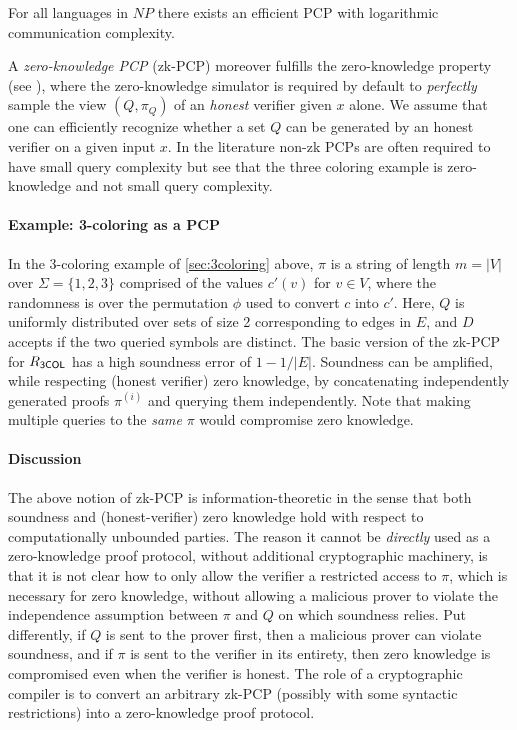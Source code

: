 \begin{theorem}\label{thm:pcp}
    For all languages in $NP$ there exists an efficient PCP with logarithmic communication complexity.
\end{theorem}

A \emph{zero-knowledge PCP} (zk-PCP) moreover fulfills the zero-knowledge property (see ), where the zero-knowledge simulator is required by default to {\em perfectly} sample the view $(Q,\pi_Q)$ of an {\em honest} verifier given $x$ alone.
We assume that one can efficiently recognize whether a set $Q$ can be generated by an honest verifier on a given input $x$.
In the literature non-zk PCPs are often required to have small query complexity but see that the three coloring example is zero-knowledge and not small query complexity.


\paragraph{Example: 3-coloring as a PCP}
In the 3-coloring example of \cref{sec:3coloring} above, $\pi$ is a string of length $m=|V|$ over $\Sigma=\{1,2,3\}$ comprised of the values $c'(v)$ for $v\in V$, where the randomness is over the permutation $\phi$ used to convert $c$ into $c'$.
Here, $Q$ is uniformly distributed over sets of size 2 corresponding to edges in $E$, and $D$ accepts if the two queried symbols are distinct.
The basic version of the zk-PCP for $R_{\sf 3COL}$ has a high soundness error of $1-1/|E|$.
Soundness can be amplified, while respecting (honest verifier) zero knowledge, by concatenating independently generated proofs $\pi^{(i)}$ and querying them independently. Note that making multiple queries to the {\em same} $\pi$ would compromise zero knowledge.


\paragraph{Discussion}
The above notion of zk-PCP is information-theoretic in the sense that both soundness and (honest-verifier) zero knowledge hold with respect to computationally unbounded parties.
The reason it cannot be {\em directly} used as a zero-knowledge proof protocol, without additional cryptographic machinery, is that it is not clear how to only allow the verifier a restricted access to $\pi$, which is necessary for zero knowledge, without allowing a malicious prover to violate the independence assumption between $\pi$ and $Q$ on which soundness relies.
Put differently, if $Q$ is sent to the prover first, then a malicious prover can violate soundness, and if $\pi$ is sent to the verifier in its entirety, then zero knowledge is compromised even when the verifier is honest.
The role of a cryptographic compiler is to convert an arbitrary zk-PCP (possibly with some syntactic restrictions) into a zero-knowledge proof protocol. 
\loosen


